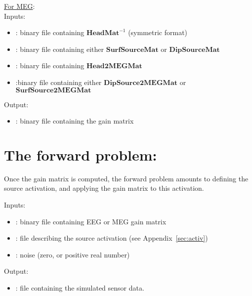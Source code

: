 \bigskip

\checkItem\underline{For MEG}:\\
Inputs:
\begin{itemize}
    \item {}: binary file containing $\mathbf{HeadMat}^{-1}$ (symmetric format)
    \item {}: binary file containing either  $\mathbf{SurfSourceMat}$ or  $\mathbf{DipSourceMat}$
    \item {}: binary file containing $\mathbf{Head2MEGMat}$
    \item {}:binary file containing either  $\mathbf{DipSource2MEGMat}$ or $\mathbf{SurfSource2MEGMat}$
\end{itemize}
Output:
\begin{itemize}
    \item {}: binary file containing the gain matrix
\end{itemize}

\medskip

\noindent
{}


\section{The forward problem:}
\label{sect: command direct}

Once the gain matrix is computed, the forward problem amounts to defining the source activation, and applying the gain matrix to this activation.

Inputs: 
\begin{itemize}
    \item {}: binary file containing EEG or MEG gain matrix
    \item {}: file describing the source activation (see Appendix~\ref{sec:activ})
    \item {}: noise (zero, or positive real number)
\end{itemize}
Output:
\begin{itemize}
    \item {}: file containing the simulated sensor data.
\end{itemize}

\medskip

\noindent
{}
